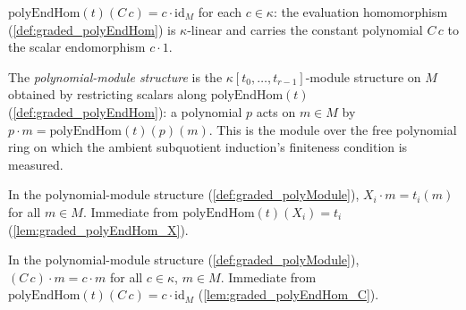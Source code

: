 \begin{lemma}
  \label{lem:graded_polyEndHom_C}
  \(\mathrm{polyEndHom}(t)(C\,c) = c \cdot \mathrm{id}_M\) for each \(c \in \kappa\):
  the evaluation homomorphism (\cref{def:graded_polyEndHom}) is \(\kappa\)-linear and
  carries the constant polynomial \(C\,c\) to the scalar endomorphism \(c \cdot 1\).
\end{lemma}

\begin{definition}
  \label{def:graded_polyModule}
  The \emph{polynomial-module structure} is the \(\kappa[t_0, \dots, t_{r-1}]\)-module
  structure on \(M\) obtained by restricting scalars along
  \(\mathrm{polyEndHom}(t)\) (\cref{def:graded_polyEndHom}): a polynomial \(p\) acts on
  \(m \in M\) by \(p \cdot m = \mathrm{polyEndHom}(t)(p)(m)\). This is the module over the
  free polynomial ring on which the ambient subquotient induction's finiteness condition
  is measured.
\end{definition}

\begin{lemma}\leanok
[$X_i$ acts as $t_i$]
  \label{lem:graded_polyModule_X_smul}
  In the polynomial-module structure (\cref{def:graded_polyModule}), \(X_i \cdot m =
  t_i(m)\) for all \(m \in M\). Immediate from
  \(\mathrm{polyEndHom}(t)(X_i) = t_i\) (\cref{lem:graded_polyEndHom_X}).
\end{lemma}

\begin{lemma}
  \label{lem:graded_polyModule_C_smul}
  In the polynomial-module structure (\cref{def:graded_polyModule}), \((C\,c) \cdot m =
  c \cdot m\) for all \(c \in \kappa\), \(m \in M\). Immediate from
  \(\mathrm{polyEndHom}(t)(C\,c) = c \cdot \mathrm{id}_M\)
  (\cref{lem:graded_polyEndHom_C}).
\end{lemma}


